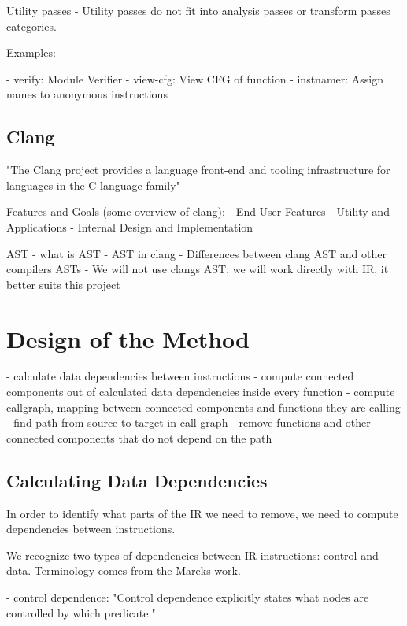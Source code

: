 \documentclass[12pt, twoside]{fithesis2}
\renewcommand{\_}{\leavevmode \kern0.07em\vbox{\hrule width0.4em}}
\begin{document}
Utility passes
- Utility passes do not fit into analysis passes or transform passes categories.

Examples:

- verify: Module Verifier
- view-cfg: View CFG of function
- instnamer: Assign names to anonymous instructions

\section{Clang}
\label{sec:llvm-clang}

"The Clang project provides a language front-end and tooling infrastructure for
languages in the C language family"

Features and Goals (some overview of clang):
- End-User Features
- Utility and Applications
- Internal Design and Implementation

AST
- what is AST
- AST in clang
- Differences between clang AST and other compilers ASTs
- We will not use clangs AST, we will work directly with IR, it better suits
this project


\chapter{Design of the Method}
\label{chap:design}

- calculate data dependencies between instructions
- compute connected components out of calculated data dependencies inside every
function
- compute callgraph, mapping between connected components and functions they
are calling
- find path from source to target in call graph
- remove functions and other connected components that do not depend on the
path

\section{Calculating Data Dependencies}
\label{sec:design-dep}

In order to identify what parts of the IR we need to remove, we need to compute
dependencies between instructions.

We recognize two types of dependencies between IR instructions: control and
data. Terminology comes from the Mareks work.

- control dependence: "Control dependence explicitly states what nodes are
controlled by which predicate."
\end{document}
